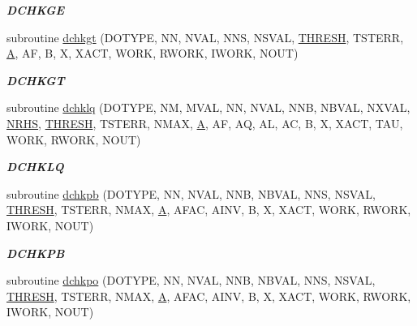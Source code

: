 \begin{DoxyCompactItemize}
\begin{DoxyCompactList}\small\item\em {\bfseries D\+C\+H\+K\+G\+E} \end{DoxyCompactList}\item 
subroutine \hyperlink{group__double__lin_gacc4ad7de84a506c7079da09484b6ebb5}{dchkgt} (D\+O\+T\+Y\+P\+E, N\+N, N\+V\+A\+L, N\+N\+S, N\+S\+V\+A\+L, \hyperlink{zlaqgs_8c_a0656018abfc9fa2821827415f5d5ea57}{T\+H\+R\+E\+S\+H}, T\+S\+T\+E\+R\+R, \hyperlink{classA}{A}, A\+F, B, X, X\+A\+C\+T, W\+O\+R\+K, R\+W\+O\+R\+K, I\+W\+O\+R\+K, N\+O\+U\+T)
\begin{DoxyCompactList}\small\item\em {\bfseries D\+C\+H\+K\+G\+T} \end{DoxyCompactList}\item 
subroutine \hyperlink{group__double__lin_gaa9a94744c99894a08649456e3e84a5a3}{dchklq} (D\+O\+T\+Y\+P\+E, N\+M, M\+V\+A\+L, N\+N, N\+V\+A\+L, N\+N\+B, N\+B\+V\+A\+L, N\+X\+V\+A\+L, \hyperlink{example__user_8c_aa0138da002ce2a90360df2f521eb3198}{N\+R\+H\+S}, \hyperlink{zlaqgs_8c_a0656018abfc9fa2821827415f5d5ea57}{T\+H\+R\+E\+S\+H}, T\+S\+T\+E\+R\+R, N\+M\+A\+X, \hyperlink{classA}{A}, A\+F, A\+Q, A\+L, A\+C, B, X, X\+A\+C\+T, T\+A\+U, W\+O\+R\+K, R\+W\+O\+R\+K, N\+O\+U\+T)
\begin{DoxyCompactList}\small\item\em {\bfseries D\+C\+H\+K\+L\+Q} \end{DoxyCompactList}\item 
subroutine \hyperlink{group__double__lin_ga5321356b81429d01d4bca0b544171678}{dchkpb} (D\+O\+T\+Y\+P\+E, N\+N, N\+V\+A\+L, N\+N\+B, N\+B\+V\+A\+L, N\+N\+S, N\+S\+V\+A\+L, \hyperlink{zlaqgs_8c_a0656018abfc9fa2821827415f5d5ea57}{T\+H\+R\+E\+S\+H}, T\+S\+T\+E\+R\+R, N\+M\+A\+X, \hyperlink{classA}{A}, A\+F\+A\+C, A\+I\+N\+V, B, X, X\+A\+C\+T, W\+O\+R\+K, R\+W\+O\+R\+K, I\+W\+O\+R\+K, N\+O\+U\+T)
\begin{DoxyCompactList}\small\item\em {\bfseries D\+C\+H\+K\+P\+B} \end{DoxyCompactList}\item 
subroutine \hyperlink{group__double__lin_gafd1294dcff01197e2666eea0a0ab4d8c}{dchkpo} (D\+O\+T\+Y\+P\+E, N\+N, N\+V\+A\+L, N\+N\+B, N\+B\+V\+A\+L, N\+N\+S, N\+S\+V\+A\+L, \hyperlink{zlaqgs_8c_a0656018abfc9fa2821827415f5d5ea57}{T\+H\+R\+E\+S\+H}, T\+S\+T\+E\+R\+R, N\+M\+A\+X, \hyperlink{classA}{A}, A\+F\+A\+C, A\+I\+N\+V, B, X, X\+A\+C\+T, W\+O\+R\+K, R\+W\+O\+R\+K, I\+W\+O\+R\+K, N\+O\+U\+T)

\end{DoxyCompactItemize}

